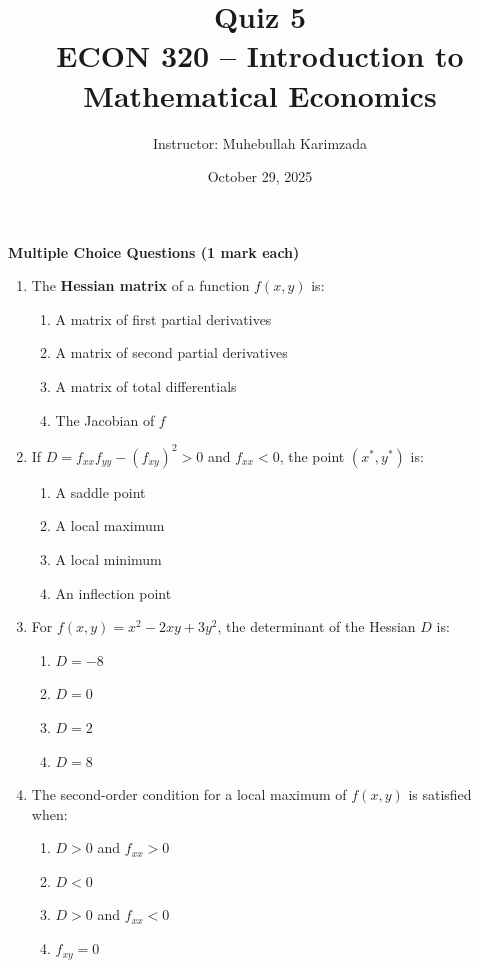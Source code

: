 \documentclass[12pt]{article}
\title{Quiz 5\\ \vspace{5pt}
\large ECON 320 -- Introduction to Mathematical Economics}
\author{Instructor: Muhebullah Karimzada}
\date{October 29, 2025}
\begin{document}
\maketitle

\noindent\textbf{{Multiple Choice Questions (1 mark each)}}

\begin{enumerate}

\item The \textbf{Hessian matrix} of a function $f(x,y)$ is:
\begin{enumerate}
\item A matrix of first partial derivatives
\item A matrix of second partial derivatives
\item A matrix of total differentials
\item The Jacobian of $f$
\end{enumerate}

\vspace{0.5em}

\item If $D = f_{xx}f_{yy} - (f_{xy})^2 > 0$ and $f_{xx} < 0$, the point $(x^*, y^*)$ is:
\begin{enumerate}
\item A saddle point
\item A local maximum
\item A local minimum
\item An inflection point
\end{enumerate}

\vspace{0.5em}

\item For $f(x, y) = x^2 - 2xy + 3y^2$, the determinant of the Hessian $D$ is:
\begin{enumerate}
\item $D = -8$
\item $D = 0$
\item $D = 2$
\item $D = 8$
\end{enumerate}

\vspace{0.5em}

\item The second-order condition for a local maximum of $f(x,y)$ is satisfied when:
\begin{enumerate}
\item $D > 0$ and $f_{xx} > 0$
\item $D < 0$
\item $D > 0$ and $f_{xx} < 0$
\item $f_{xy} = 0$
\end{enumerate}


\end{enumerate}
\end{document}
